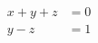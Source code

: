 \documentclass{article}
\begin{document}
\thispagestyle{empty}
\setcounter{equation}{3}
\begin{align}
  x + y + z &= 0 \\
  y - z &= 1 
\end{align}
\end{document}
